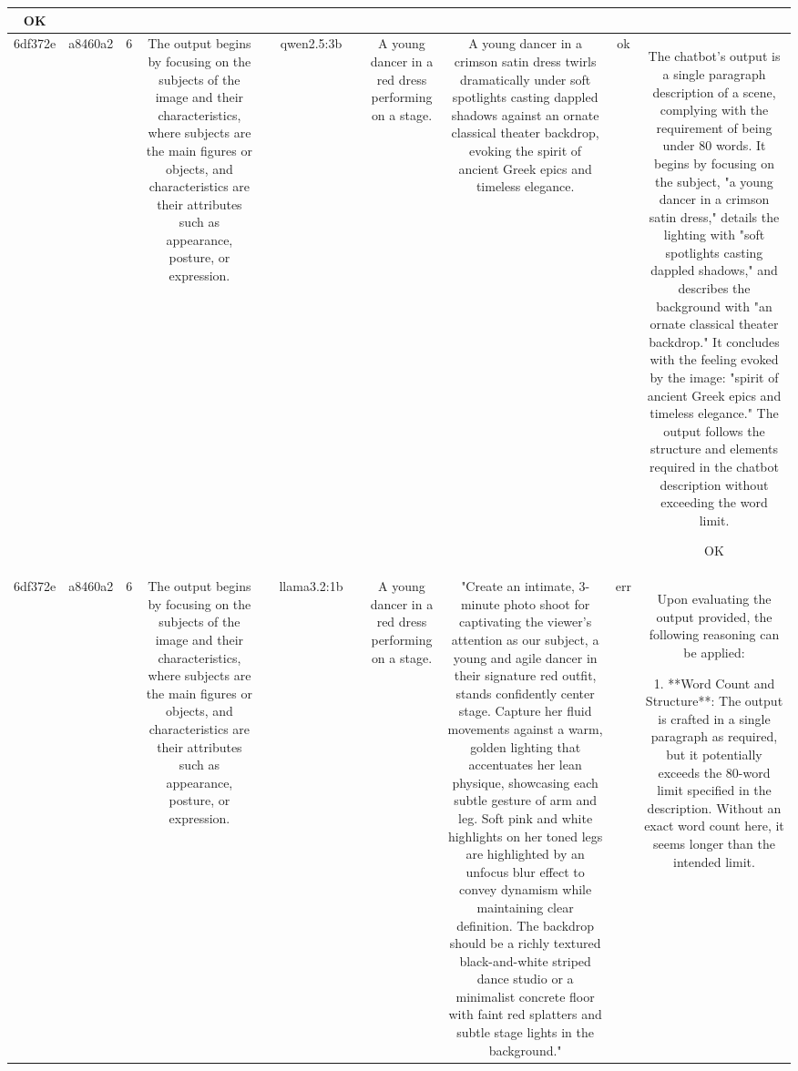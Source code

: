 \begin{table}[h!]
\begin{tabular}{|c|c|c|c|c|c|c|c|c|c|c|}
OK\\
\hline
6df372e & a8460a2 & 6 & The output begins by focusing on the subjects of the image and their characteristics, where subjects are the main figures or objects, and characteristics are their attributes such as appearance, posture, or expression. &  & qwen2.5:3b &  & A young dancer in a red dress performing on a stage. & A young dancer in a crimson satin dress twirls dramatically under soft spotlights casting dappled shadows against an ornate classical theater backdrop, evoking the spirit of ancient Greek epics and timeless elegance. & ok & The chatbot's output is a single paragraph description of a scene, complying with the requirement of being under 80 words. It begins by focusing on the subject, "a young dancer in a crimson satin dress," details the lighting with "soft spotlights casting dappled shadows," and describes the background with "an ornate classical theater backdrop." It concludes with the feeling evoked by the image: "spirit of ancient Greek epics and timeless elegance." The output follows the structure and elements required in the chatbot description without exceeding the word limit.

OK\\
\hline
6df372e & a8460a2 & 6 & The output begins by focusing on the subjects of the image and their characteristics, where subjects are the main figures or objects, and characteristics are their attributes such as appearance, posture, or expression. &  & llama3.2:1b &  & A young dancer in a red dress performing on a stage. & "Create an intimate, 3-minute photo shoot for captivating the viewer's attention as our subject, a young and agile dancer in their signature red outfit, stands confidently center stage. Capture her fluid movements against a warm, golden lighting that accentuates her lean physique, showcasing each subtle gesture of arm and leg. Soft pink and white highlights on her toned legs are highlighted by an unfocus blur effect to convey dynamism while maintaining clear definition. The backdrop should be a richly textured black-and-white striped dance studio or a minimalist concrete floor with faint red splatters and subtle stage lights in the background." & err & Upon evaluating the output provided, the following reasoning can be applied:

1. **Word Count and Structure**: The output is crafted in a single paragraph as required, but it potentially exceeds the 80-word limit specified in the description. Without an exact word count here, it seems longer than the intended limit.
   

\end{tabular}
\end{table}

